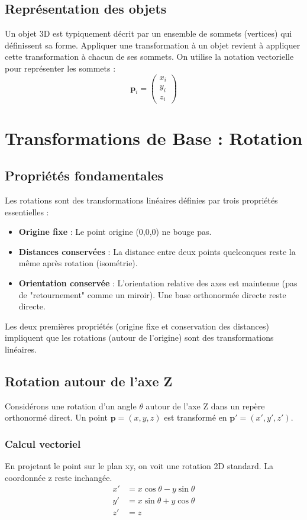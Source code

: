 \subsection{Représentation des objets}
Un objet 3D est typiquement décrit par un ensemble de sommets (vertices) qui définissent sa forme. Appliquer une transformation à un objet revient à appliquer cette transformation à chacun de ses sommets.
On utilise la notation vectorielle pour représenter les sommets :
\[ \mathbf{p}_i = \begin{pmatrix} x_i \\ y_i \\ z_i \end{pmatrix} \]
\section{Transformations de Base : Rotation}
\subsection{Propriétés fondamentales}
Les rotations sont des transformations linéaires définies par trois propriétés essentielles :
\begin{itemize}
    \item \textbf{Origine fixe} : Le point origine (0,0,0) ne bouge pas.
    \item \textbf{Distances conservées} : La distance entre deux points quelconques reste la même après rotation (isométrie).
    \item \textbf{Orientation conservée} : L'orientation relative des axes est maintenue (pas de "retournement" comme un miroir). Une base orthonormée directe reste directe.
\end{itemize}
Les deux premières propriétés (origine fixe et conservation des distances) impliquent que les rotations (autour de l'origine) sont des transformations linéaires.
\subsection{Rotation autour de l'axe Z}
Considérons une rotation d'un angle \( \theta \) autour de l'axe Z dans un repère orthonormé direct. Un point \( \mathbf{p} = (x, y, z) \) est transformé en \( \mathbf{p'} = (x', y', z') \).
\subsubsection{Calcul vectoriel}
En projetant le point sur le plan xy, on voit une rotation 2D standard. La coordonnée z reste inchangée.
\begin{align*} x' &= x \cos \theta - y \sin \theta \\ y' &= x \sin \theta + y \cos \theta \\ z' &= z \end{align*}
